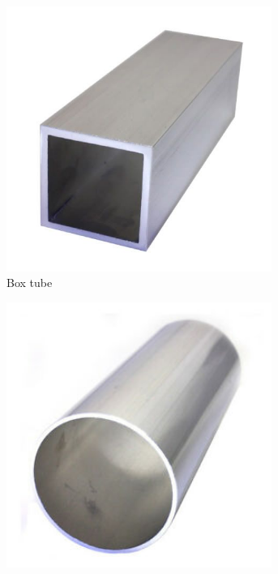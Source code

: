 \documentclass[10pt,letterpaper]{book}
\begin{document}
\begin{figure}[H]
\begin{subfigure}[b]{.24\linewidth}
		\includegraphics[width=0.95\textwidth]{imgs/extrusion_boxtube.jpeg}
		\caption{Box tube}
	\end{subfigure} \begin{subfigure}[b]{.24\linewidth}
		\includegraphics[width=0.95\textwidth]{imgs/extrusion_roundtube.jpeg}

\end{subfigure}
\end{figure}
\end{document}
